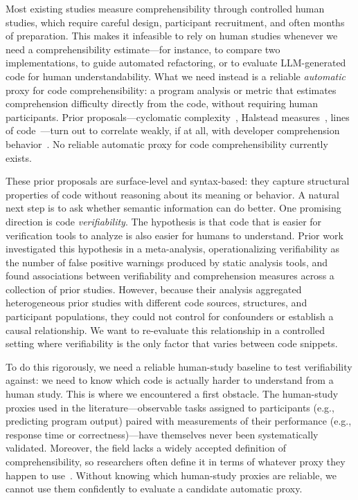 \documentclass[sigplan,10pt,anonymous=false]{acmart}
\begin{document}
Most existing studies measure comprehensibility through controlled human
studies, which require careful design, participant recruitment, and often
months of preparation.
This makes it infeasible to rely on human studies whenever we need a
comprehensibility estimate---for instance, to compare two implementations,
to guide automated refactoring, or to evaluate LLM-generated code for
human understandability.
What we need instead is a reliable \emph{automatic} proxy for code
comprehensibility: a program analysis or metric that estimates comprehension
difficulty directly from the code, without requiring human participants.
Prior proposals---cyclomatic complexity~\cite{curtis2006measuring}, Halstead measures~\cite{chidamber1994metrics}, lines of
code~\cite{nunez2017source}---turn out to correlate weakly, if at all, with developer comprehension
behavior~\cite{feigenspan2011exploring,peitek2021program,scalabrino2019automatically}.
No reliable automatic proxy for code comprehensibility currently exists.

These prior proposals are surface-level and syntax-based: they capture
structural properties of code without reasoning about its meaning or behavior.
A natural next step is to ask whether semantic information can do better.
One promising direction is code \emph{verifiability}.
The hypothesis is that code that is easier for verification tools to analyze
is also easier for humans to understand.
Prior work~\cite{FeldmanKC2023} investigated this hypothesis in a
meta-analysis, operationalizing verifiability as the number of false positive
warnings produced by static analysis tools, and found associations between
verifiability and comprehension measures across a collection of prior studies.
However, because their analysis aggregated heterogeneous prior studies with
different code sources, structures, and participant populations, they could
not control for confounders or establish a causal relationship.
We want to re-evaluate this relationship in a controlled setting where
verifiability is the only factor that varies between code snippets.

To do this rigorously, we need a reliable human-study baseline to test
verifiability against: we need to know which code is actually harder to
understand from a human study.
This is where we encountered a first obstacle.
The human-study proxies used in the literature---observable tasks assigned
to participants (e.g., predicting program output) paired with measurements
of their performance (e.g., response time or correctness)---have themselves
never been systematically validated.
Moreover, the field lacks a widely accepted definition of comprehensibility,
so researchers often define it in terms of whatever proxy they happen to
use~\cite{Wyrich:ACS23}.
Without knowing which human-study proxies are reliable, we cannot use them
confidently to evaluate a candidate automatic proxy.
\end{document}
